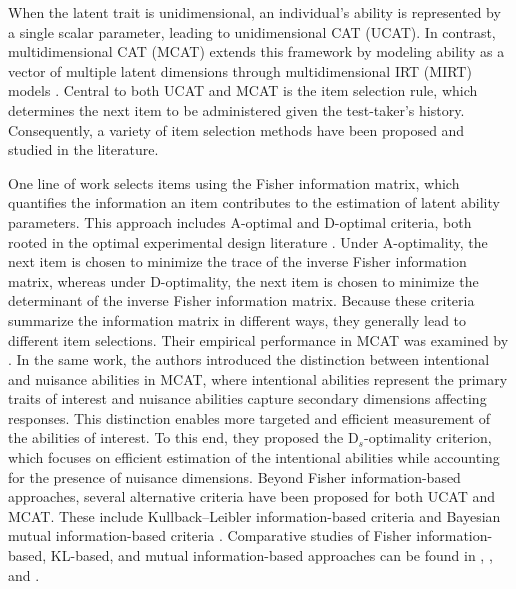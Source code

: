 \documentclass[12pt]{article}
\begin{document}
When the latent trait is unidimensional, an individual’s ability is represented by a single scalar parameter, leading to unidimensional CAT (UCAT). In contrast, multidimensional CAT (MCAT) extends this framework by modeling ability as a vector of multiple latent dimensions through multidimensional IRT (MIRT) models \cite{luecht1996multidimensional, mcdonald1997normal, reckase1997linear}. Central to both UCAT and MCAT is the item selection rule, which determines the next item to be administered given the test-taker's history. Consequently, a variety of item selection methods have been proposed and studied in the literature.

One line of work selects items using the Fisher information matrix, which quantifies the information an item contributes to the estimation of latent ability parameters. This approach includes A-optimal and D-optimal criteria, both rooted in the optimal experimental design literature \cite{silvey2013optimal,atkinson2007optimum}. Under A-optimality, the next item is chosen to minimize the trace of the inverse Fisher information matrix, whereas under D-optimality, the next item is chosen to minimize the determinant of the inverse Fisher information matrix. Because these criteria summarize the information matrix in different ways, they generally lead to different item selections. Their empirical performance in MCAT was examined by . In the same work, the authors introduced the distinction between intentional and nuisance abilities in MCAT, where intentional abilities represent the primary traits of interest and nuisance abilities capture secondary dimensions affecting responses. This distinction enables more targeted and efficient measurement of the abilities of interest. To this end, they proposed the $\mathrm{D}_s$-optimality criterion, which focuses on efficient estimation of the intentional abilities while accounting for the presence of nuisance dimensions. Beyond Fisher information-based approaches, several alternative criteria have been proposed for both UCAT and MCAT. These include Kullback–Leibler information-based criteria \cite{chang1996global} and Bayesian mutual information-based criteria \cite{veldkamp2002multidimensional,mulder2009kullback}. Comparative studies of Fisher information-based, KL-based, and mutual information-based approaches can be found in , , and .
\end{document}
